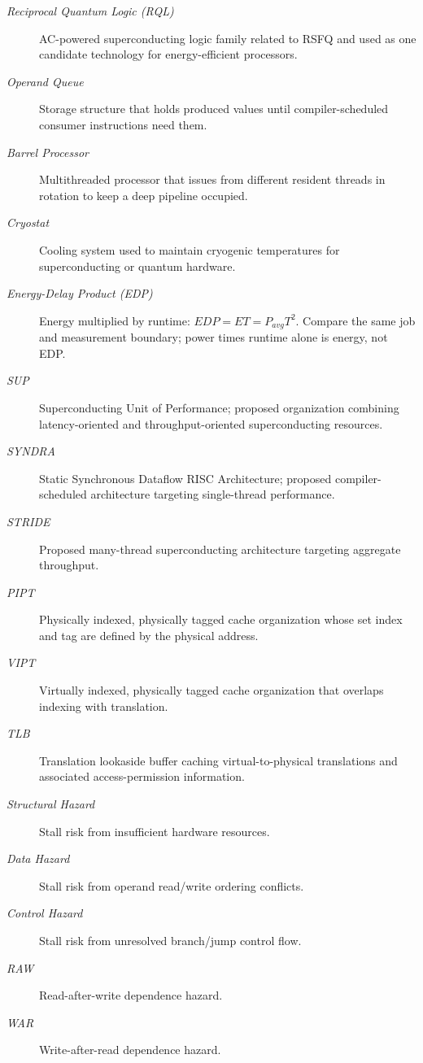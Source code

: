\begin{description}
    \item[\textit{Reciprocal Quantum Logic (RQL)}] AC-powered superconducting logic family related to RSFQ and used as one candidate technology for energy-efficient processors.
    \item[\textit{Operand Queue}] Storage structure that holds produced values until compiler-scheduled consumer instructions need them.
    \item[\textit{Barrel Processor}] Multithreaded processor that issues from different resident threads in rotation to keep a deep pipeline occupied.
    \item[\textit{Cryostat}] Cooling system used to maintain cryogenic temperatures for superconducting or quantum hardware.
    \item[\textit{Energy-Delay Product (EDP)}] Energy multiplied by runtime: $EDP=ET=P_{avg}T^2$. Compare the same job and measurement boundary; power times runtime alone is energy, not EDP.
    \item[\textit{SUP}] Superconducting Unit of Performance; proposed organization combining latency-oriented and throughput-oriented superconducting resources.
    \item[\textit{SYNDRA}] Static Synchronous Dataflow RISC Architecture; proposed compiler-scheduled architecture targeting single-thread performance.
    \item[\textit{STRIDE}] Proposed many-thread superconducting architecture targeting aggregate throughput.
    \item[\textit{PIPT}] Physically indexed, physically tagged cache organization whose set index and tag are defined by the physical address.
    \item[\textit{VIPT}] Virtually indexed, physically tagged cache organization that overlaps indexing with translation.
    \item[\textit{TLB}] Translation lookaside buffer caching virtual-to-physical translations and associated access-permission information.
    \item[\textit{Structural Hazard}] Stall risk from insufficient hardware resources.
    \item[\textit{Data Hazard}] Stall risk from operand read/write ordering conflicts.
    \item[\textit{Control Hazard}] Stall risk from unresolved branch/jump control flow.
    \item[\textit{RAW}] Read-after-write dependence hazard.
    \item[\textit{WAR}] Write-after-read dependence hazard.

\end{description}
